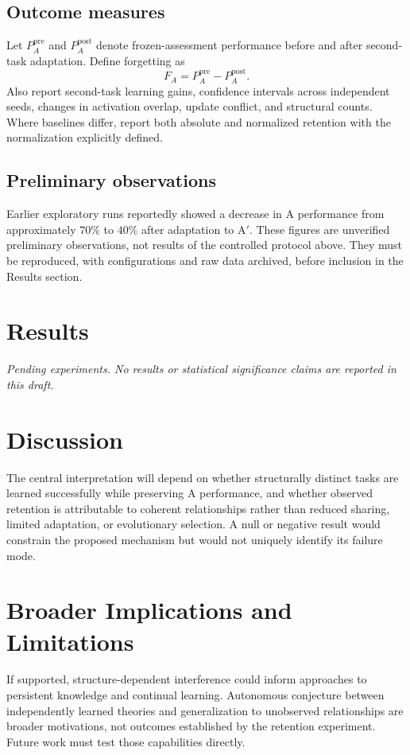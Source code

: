 \documentclass[11pt]{article}
\begin{document}
\subsection{Outcome measures}
Let $P_A^{\mathrm{pre}}$ and $P_A^{\mathrm{post}}$ denote frozen-assessment performance before and after second-task adaptation. Define forgetting as
\begin{equation}
F_A=P_A^{\mathrm{pre}}-P_A^{\mathrm{post}}.
\end{equation}
Also report second-task learning gains, confidence intervals across independent seeds, changes in activation overlap, update conflict, and structural counts. Where baselines differ, report both absolute and normalized retention with the normalization explicitly defined.

\subsection{Preliminary observations}
Earlier exploratory runs reportedly showed a decrease in A performance from approximately $70\%$ to $40\%$ after adaptation to A$'$. These figures are unverified preliminary observations, not results of the controlled protocol above. They must be reproduced, with configurations and raw data archived, before inclusion in the Results section.

\section{Results}
\emph{Pending experiments. No results or statistical significance claims are reported in this draft.}

\section{Discussion}
The central interpretation will depend on whether structurally distinct tasks are learned successfully while preserving A performance, and whether observed retention is attributable to coherent relationships rather than reduced sharing, limited adaptation, or evolutionary selection. A null or negative result would constrain the proposed mechanism but would not uniquely identify its failure mode.

\section{Broader Implications and Limitations}
If supported, structure-dependent interference could inform approaches to persistent knowledge and continual learning. Autonomous conjecture between independently learned theories and generalization to unobserved relationships are broader motivations, not outcomes established by the retention experiment. Future work must test those capabilities directly.
\end{document}
